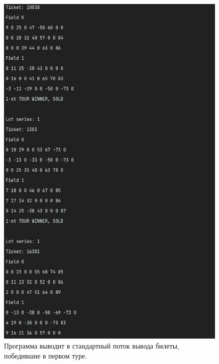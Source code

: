 \documentclass[a4paper,14pt]{article}
\begin{document}
\begin{figure}
  \centering
  \includegraphics[width=\linewidth]{pictures/3}
  \caption{Программа выводит в стандартный поток вывода билеты, победившие в первом туре.}
\end{figure}
\end{document}
